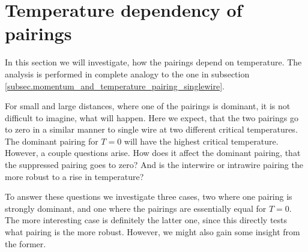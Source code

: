 
\section{Temperature dependency of pairings} \label{sec.2wirespairingstemperature}
In this section we will investigate, how the pairings depend on temperature. The analysis is performed in complete analogy to the one in subsection \ref{subsec.momentum_and_temperature_pairing_singlewire}. 

For small and large distances, where one of the pairings is dominant, it is not difficult to imagine, what will happen. Here we expect, that the two pairings go to zero in a similar manner to single wire at two different critical temperatures. The dominant pairing for $T = 0$ will have the highest critical temperature. However, a couple questions arise. How does it affect the dominant pairing, that the suppressed pairing goes to zero? And is the interwire or intrawire pairing the more robust to a rise in temperature?

To answer these questions we investigate three cases, two where one pairing is strongly dominant, and one where the pairings are essentially equal for $T = 0$. The more interesting case is definitely the latter one, since this directly tests what pairing is the more robust. However, we might also gain some insight from the former. 

